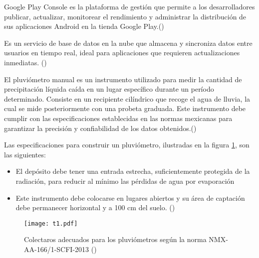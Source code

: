 \begin{definition}
  Google Play Console es la plataforma de gestión que permite a los desarrolladores publicar, actualizar, monitorear el rendimiento y administrar la distribución de sus aplicaciones Android en la tienda Google Play.(\cite{googleplayconsole})


\end{definition}

\begin{definition}
Es un servicio de base de datos en la nube que almacena y sincroniza datos entre usuarios en tiempo real, ideal para aplicaciones que requieren actualizaciones inmediatas. (\cite{firebaserealtime})
\end{definition}
















\begin{definition}

El pluviómetro manual es un instrumento utilizado para medir la cantidad de precipitación líquida caída en un lugar específico durante un período determinado. Consiste en un recipiente cilíndrico que recoge el agua de lluvia, la cual se mide posteriormente con una probeta graduada. Este instrumento debe cumplir con las especificaciones establecidas en las normas mexicanas para garantizar la precisión y confiabilidad de los datos obtenidos.(\cite{semarnat_pluviometro})
\end{definition}

Las especificaciones para construir un pluviómetro, ilustradas en la figura \ref{t1}, son las siguientes:
\begin{itemize}
    \item El depósito debe tener una entrada estrecha, suficientemente protegida de la radiación, para reducir al mínimo las pérdidas de agua por evaporación
    \item Este instrumento debe colocarse en lugares abiertos y su área de captación debe permanecer horizontal y a 100 cm del suelo. (\cite{se2013})
\end{itemize}

\begin{figure}[ht]
\centering
  \texttt{[image: t1.pdf]}
  \caption{Colectaros adecuados para los pluviómetros según la norma NMX-AA-166/1-SCFI-2013 (\cite{se2013})}
  \label{t1}
\end{figure}




















